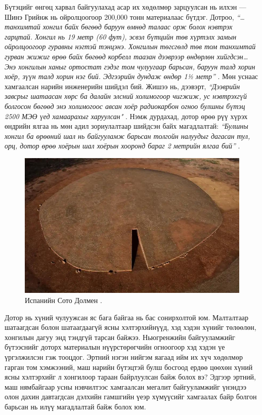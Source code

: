 \documentclass[10pt,twocolumn,letterpaper]{article}
\begin{document}
Бүтэцийг өнгөц харвал байгуулахад асар их хөдөлмөр зарцуулсан нь илхэн — Шинэ Грийнж нь ойролцоогоор 200,000 тонн материалаас бүтдэг. Дотроо, \textit{“…танхимтай хонгил байх бөгөөд баруун өмнөд талаас орж болох нэвтрэх гарцтай. Хонгил нь 19 метр (60 фут), эсвэл бүтцийн төв хүртэлх замын ойролцоогоор гуравны нэгтэй тэнцэнэ. Хонгилын төгсгөлд төв том танхимтай гурван жижиг өрөө байх бөгөөд корбелл таазан дээврээр өндөрлөн хийгдсэн… Энэ хонгилын ханыг ортостат гэдэг том чулуугаар барьсан, баруун талд хорин хоёр, зүүн талд хорин нэг бий. Эдгээрийн дундаж өндөр 1½ метр”} \cite{70}. Мөн уснаас хамгаалсан нарийн инженерийн шийдэл бий. Жишээ нь, дээвэрт, \textit{“Дээврийн завсрыг шатаасан хөрс ба далайн элсний холимогоор чигжиж, ус нэвтрэхгүй болгосон бөгөөд энэ холимогоос авсан хоёр радиокарбон огноо булшны бүтэц 2500 МЭӨ үед хамаарахыг харуулсан"} \cite{71}. Нэмж дурдахад, дотор өрөө рүү хүрэх өндрийн ялгаа нь мөн адил зориулалтаар шийдсэн байх магадлалтай: \textit{“Булшны хонгил ба өрөөний шал нь байгууламж барьсан толгойн налуудыг дагасан тул, орц, дотор өрөө хоёрын шал хоёрын хооронд бараг 2 метрийн ялгаа бий”} \cite{71}.

\begin{figure}[b]

\begin{center}
   \includegraphics[width=1\linewidth]{dolmen.jpg}
\end{center}
   \caption{Испанийн Сото Долмен \cite{53}.}
\label{fig:9}
\label{fig:onecol}
\end{figure}

Дотор нь хүний чулуужсан яс бага байгаа нь бас сонирхолтой юм. Малталтаар шатаагдсан болон шатаагдаагүй ясны хэлтэрхийнүүд, хэд хэдэн хүнийг төлөөлөн, хонгилын дагуу энд тэндгүй тарсан байжээ. Ньюгренжийн байгууламжийг бүтээснийг доторх материалын нүүрстөрөгчийн огноогоор хэд хэдэн үе үргэлжилсэн гэж тооцдог. Эртний нэгэн нийгэм яагаад ийм их хүч хөдөлмөр гарган том хэмжээний, маш нарийн бүтэцтэй булш босгоод ердөө цөөхөн хүний ясны хэлтэрхийг л хонгилоор тараан байрлуулсан байж болох вэ? Эдгээр эртний, маш нямбайгаар усны нэвчилтээс хамгаалсан мегалит байгууламжийг үнэндээ олон дахин давтагдсан дэлхийн гамшгийн үеэр хүмүүсийг хамгаалах байр болгон барьсан нь илүү магадлалтай байж болох юм.
\end{document}
